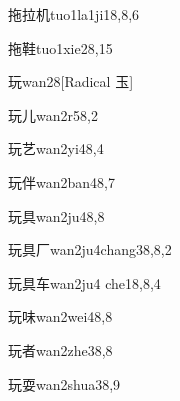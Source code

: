 \begin{verbete}{拖拉机}{tuo1la1ji1}{8,8,6}
\end{verbete}

\begin{verbete}{拖鞋}{tuo1xie2}{8,15}
\end{verbete}

\begin{verbete}{玩}{wan2}{8}[Radical 玉]
\end{verbete}

\begin{verbete}{玩儿}{wan2r5}{8,2}
\end{verbete}

\begin{verbete}{玩艺}{wan2yi4}{8,4}
\end{verbete}

\begin{verbete}{玩伴}{wan2ban4}{8,7}
\end{verbete}

\begin{verbete}{玩具}{wan2ju4}{8,8}
\end{verbete}

\begin{verbete}{玩具厂}{wan2ju4chang3}{8,8,2}
\end{verbete}

\begin{verbete}{玩具车}{wan2ju4 che1}{8,8,4}
\end{verbete}

\begin{verbete}{玩味}{wan2wei4}{8,8}
\end{verbete}

\begin{verbete}{玩者}{wan2zhe3}{8,8}
\end{verbete}

\begin{verbete}{玩耍}{wan2shua3}{8,9}
\end{verbete}

